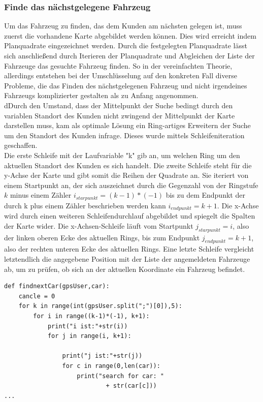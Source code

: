\subsubsection{Finde das nächstgelegene Fahrzeug}
Um das Fahrzeug  zu finden, das dem Kunden am nächsten gelegen ist, muss zuerst die vorhandene Karte abgebildet werden können. Dies wird erreicht indem Planquadrate eingezeichnet werden. Durch die festgelegten Planquadrate lässt sich anschließend durch Iterieren der Planquadrate und Abgleichen der Liste der Fahrzeuge das gesuchte Fahrzeug finden. So in der vereinfachten Theorie, allerdings entstehen bei der Umschlüsselung auf den konkreten Fall diverse Probleme, die das Finden des nächstgelegenen Fahrzeug und nicht irgendeines Fahrzeugs komplizierter gestalten als zu Anfang angenommen.\\
dDurch den Umstand, dass der Mittelpunkt der Suche bedingt durch den variablen Standort des Kunden nicht zwingend der Mittelpunkt der Karte darstellen muss, kam als optimale Lösung ein Ring-artiges Erweitern der Suche um den Standort des Kunden infrage. Dieses wurde mittels Schleifeniteration geschaffen.\\
Die erste Schleife mit der Laufvariable "k" gib an, um welchen Ring um den aktuellen Standort des Kunden es sich handelt. Die zweite Schleife steht für die y-Achse der Karte und gibt somit die Reihen der Quadrate an. Sie iteriert von einem Startpunkt an, der sich auszeichnet durch die Gegenzahl von der Ringstufe $k$ minus einem Zähler $i_{starpunkt} = (k-1)*(-1)$ bis zu dem Endpunkt der durch k plus einem Zähler beschrieben werden kann $i_{endpunkt} = k+1$. Die x-Achse wird durch einen weiteren Schleifendurchlauf abgebildet und spiegelt die Spalten der Karte wider. Die x-Achsen-Schleife läuft vom Startpunkt $j_{starpunkt} = i $, also der linken oberen Ecke des aktuellen Rings, bis zum Endpunkt $j_{endpunkt} = k+1$, also der rechten unteren Ecke des aktuellen Rings. Eine letzte Schleife vergleicht letztendlich die angegebene Position mit der Liste der angemeldeten Fahrzeuge ab, um zu prüfen, ob sich an der aktuellen Koordinate ein Fahrzeug befindet.
\begin{lstlisting}
def findnextCar(gpsUser,car):
    cancle = 0
    for k in range(int(gpsUser.split(";")[0]),5):
        for i in range((k-1)*(-1), k+1):
            print("i ist:"+str(i))
            for j in range(i, k+1):

                print("j ist:"+str(j))
                for c in range(0,len(car)):
                    print("search for car: "
                    		+ str(car[c]))
...
\end{lstlisting}
